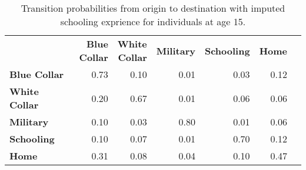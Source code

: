 \begin{ThreePartTable}

	\begin{longtable}[c]{@{}lrrrrrr@{}}
		\caption{Transition probabilities from origin to destination with imputed schooling exprience for individuals at age 15.}
		\label{tab:TransitionProbabilitiesImputing}

		\setlength\extrarowheight{2.5pt}
		
		\\
		\toprule
   & \thead{\textbf{Blue} \\ \textbf{Collar}}    & \thead{\textbf{White} \\ \textbf{Collar}}  & \textbf{Military} & \textbf{Schooling} & \textbf{Home}   \\ \midrule
		\endfirsthead
		
\textbf{Blue Collar}	&	0.73	&	0.10	&	0.01	&	0.03	&	0.12	\\
\textbf{White Collar	} &	0.20	&	0.67	&	0.01	&	0.06	&	0.06	\\
\textbf{Military	} &	0.10	&	0.03	&	0.80	&	0.01	&	0.06	\\
\textbf{Schooling}	&	0.10&	0.07	&	0.01	&	0.70	&	0.12	\\
\textbf{Home	} &	0.31	&	0.08	&	0.04	&	0.10	&	0.47	\\
  \bottomrule
	\end{longtable}
\end{ThreePartTable}
